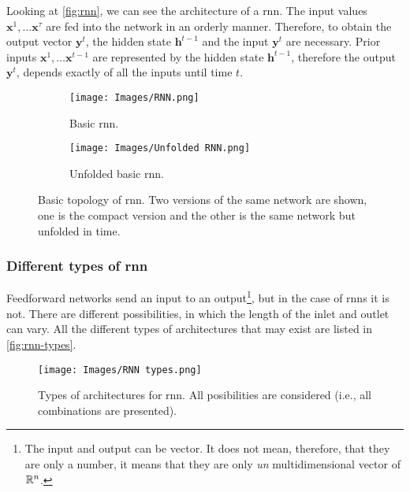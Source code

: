 Looking at \vref{fig:rnn}, we can see the architecture of a \gls{rnn}. The
input values \(\mathbf{x}^1, \ldots \mathbf{x}^\tau\) are fed into the network
in an orderly manner. Therefore, to obtain the output vector \(\mathbf{y}^t\),
the hidden state \(\mathbf{h}^{t - 1}\) and the input \(\mathbf{y}^{t}\) are
necessary. Prior inputs \(\mathbf{x}^1, \ldots \mathbf{x}^{t - 1}\) are
represented by the hidden state \(\mathbf{h}^{t - 1}\), therefore the output
\(\mathbf{y}^t\), depends exactly of all the inputs until time \(t\).

\begin{figure}[ht]
  \begin{subfigure}[t]{.2\textwidth}
    \centering
    \caption{Basic \gls{rnn}.}
    \texttt{[image: Images/RNN.png]}
  \end{subfigure}\hfill
  \begin{subfigure}[t]{.8\textwidth}
    \centering
    \caption{Unfolded basic \gls{rnn}.}
    \texttt{[image: Images/Unfolded RNN.png]}
  \end{subfigure}
  \caption[Basic topology of \acl*{rnn}]{Basic topology of \acf{rnn}. Two
    versions of the same network are shown, one is the compact version and the
    other is the same network but unfolded in time.}
  \label{fig:rnn}
\end{figure}

\subsubsection{Different types of \gls*{rnn}}
Feedforward networks send an input to an output\footnote{The input and output
  can be vector. It does not mean, therefore, that they are only a number, it
  means that they are only \emph{un} multidimensional vector of \(\mathbb{R}^n\).}, but
in the case of \glspl{rnn} it is not. There are different possibilities, in
which the length of the inlet and outlet can vary. All the different types of
architectures that may exist are listed in \vref{fig:rnn-types}.

\begin{figure}[ht]
  \centering
  \texttt{[image: Images/RNN types.png]}
  \caption[Types of architectures for \acl*{rnn}]{Types of architectures for
    \gls{rnn}. All posibilities are considered (i.e., all combinations are
    presented).}
  \label{fig:rnn-types}
\end{figure}

